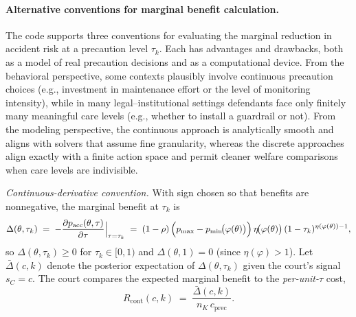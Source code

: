 \documentclass{article}
\begin{document}
\paragraph{Alternative conventions for marginal benefit calculation.}
The code supports three conventions for evaluating the marginal reduction in accident risk at a precaution level \(\tau_k\). Each has advantages and drawbacks, both as a model of real precaution decisions and as a computational device. From the behavioral perspective, some contexts plausibly involve continuous precaution choices (e.g., investment in maintenance effort or the level of monitoring intensity), while in many legal–institutional settings defendants face only finitely many meaningful care levels (e.g., whether to install a guardrail or not). From the modeling perspective, the continuous approach is analytically smooth and aligns with solvers that assume fine granularity, whereas the discrete approaches align exactly with a finite action space and permit cleaner welfare comparisons when care levels are indivisible.

\medskip
\noindent\emph{Continuous-derivative convention.}
With sign chosen so that benefits are nonnegative, the marginal benefit at \(\tau_k\) is
\[
\Delta(\theta,\tau_k)
\;=\;-\frac{\partial p_{\mathrm{acc}}(\theta,\tau)}{\partial \tau}\Big|_{\tau=\tau_k}
\;=\;(1-\rho)\,\Bigl(p_{\max}-p_{\min}\!\bigl(\varphi(\theta)\bigr)\Bigr)\,\eta\!\bigl(\varphi(\theta)\bigr)\,(1-\tau_k)^{\eta(\varphi(\theta))-1},
\]
so \(\Delta(\theta,\tau_k)\ge 0\) for \(\tau_k\in[0,1)\) and \(\Delta(\theta,1)=0\) (since \(\eta(\varphi)>1\)). Let \(\bar{\Delta}(c,k)\) denote the posterior expectation of \(\Delta(\theta,\tau_k)\) given the court’s signal \(s_C=c\). The court compares the expected marginal benefit to the \emph{per-unit-\(\tau\)} cost,
\[
R_{\mathrm{cont}}(c,k)\;=\;\frac{\bar{\Delta}(c,k)}{\,n_K\,c_{\mathrm{prec}}\,}.
\]
\end{document}
